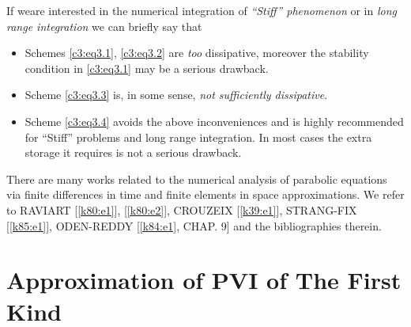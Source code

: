 \begin{remark}\label{c3:rem3.4}%
If we\pageoriginale  are interested in the numerical integration of
{\em ``Stiff''  phenomenon} or in {\em long range integration} we can
briefly say that  
\begin{itemize}
\item Schemes \eqref{c3:eq3.1}, \eqref{c3:eq3.2} are {\em too}
  dissipative, moreover the stability condition in \eqref{c3:eq3.1}
  may be a serious drawback. 
\item Scheme \eqref{c3:eq3.3} is, in some sense, {\em not sufficiently
  dissipative}. 
\item Scheme \eqref{c3:eq3.4} avoids the above inconveniences and is
  highly recommended for ``Stiff'' problems and long range
  integration. In most cases the extra storage it requires is not a
  serious drawback. 
\end{itemize}
\end{remark}

\begin{remark}\label{c3:rem3.5}%
There are many works related to the numerical analysis of parabolic
equations via finite differences in time and finite elements in space
approximations. We refer to RAVIART [\ref{k80:e1}], [\ref{k80:e2}],
CROUZEIX [\ref{k39:e1}], STRANG-FIX 
[\ref{k85:e1}], ODEN-REDDY [\ref{k84:e1}, CHAP. 9] and the
bibliographies therein.  
\end{remark}

\section{Approximation of PVI of The First Kind}\label{c3:s4}

